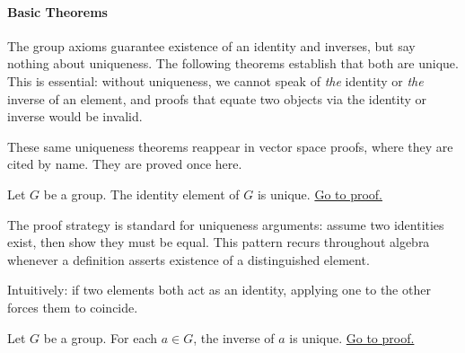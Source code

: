 \paragraph{Basic Theorems}

\begin{remark}
The group axioms guarantee existence of an identity and inverses,
but say nothing about uniqueness. The following theorems establish
that both are unique. This is essential: without uniqueness, we
cannot speak of \emph{the} identity or \emph{the} inverse of an element,
and proofs that equate two objects via the identity or inverse would
be invalid.

These same uniqueness theorems reappear in vector space proofs,
where they are cited by name. They are proved once here.
\end{remark}

\begin{proposition}
\label{prop:group-identity-unique}
Let $G$ be a group. The identity element of $G$ is unique.
\hyperref[prf:group-identity-unique]{Go to proof.}
\end{proposition}

\begin{remark*}
\end{remark*}



\begin{remark}
The proof strategy is standard for uniqueness arguments:
assume two identities exist, then show they must be equal.
This pattern recurs throughout algebra whenever a definition
asserts existence of a distinguished element.

Intuitively: if two elements both act as an identity,
applying one to the other forces them to coincide.
\end{remark}

\begin{proposition}
\label{prop:group-inverse-unique}
Let $G$ be a group. For each $a \in G$, the inverse of $a$ is unique.
\hyperref[prf:group-inverse-unique]{Go to proof.}
\end{proposition}

